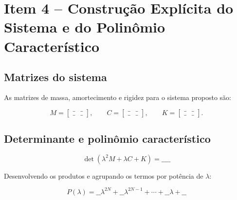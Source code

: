 \documentclass[12pt,a4paper]{article}
\begin{document}
\section{Item 4 -- Construção Explícita do Sistema e do Polinômio Característico}


\subsection{Matrizes do sistema}

As matrizes de massa, amortecimento e rigidez para o sistema proposto são:

\begin{equation}
    M =
    \begin{bmatrix}
        \_ & \_ \\
        \_ & \_
    \end{bmatrix}, \qquad
    C =
    \begin{bmatrix}
        \_ & \_ \\
        \_ & \_
    \end{bmatrix}, \qquad
    K =
    \begin{bmatrix}
        \_ & \_ \\
        \_ & \_
    \end{bmatrix}.
    \label{eq:matrizes}
\end{equation}

\subsection{Determinante e polinômio característico}


\begin{equation}
    \det\left(\lambda^2 M + \lambda C + K\right) = \_\_\_\_
\end{equation}

Desenvolvendo os produtos e agrupando os termos por potência de $\lambda$:

\begin{equation}
    P(\lambda) = \_\_ \lambda^{2N} + \_\_ \lambda^{2N-1} + \cdots + \_\_ \lambda + \_\_
\end{equation}
\end{document}
